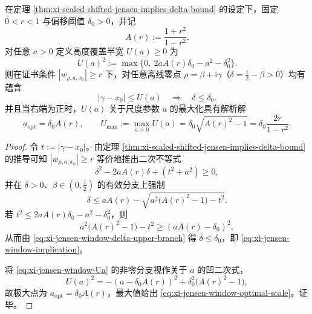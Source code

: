 \begin{theorem}[给定偏移阈值下的高度覆盖窗与尺度最优选择]\label{thm:xi-jensen-window-optimal-scale}
在定理 \ref{thm:xi-scaled-shifted-jensen-implies-delta-bound} 的设定下，固定 \(0<r<1\) 与偏移阈值 \(\delta_0>0\)，并记
\[
A(r):=\frac{1+r^2}{1-r^2}.
\]
对任意 \(a>0\) 定义高度覆盖半宽 \(U(a)\ge 0\) 为
\begin{equation}\label{eq:xi-jensen-window-Ua}
U(a)^2:=\max\bigl\{0,\ 2aA(r)\delta_0-a^2-\delta_0^2\bigr\}.
\end{equation}
则在证书条件 \(|w_{\rho,a,x_0}|\ge r\) 下，对任意离线零点 \(\rho=\beta+\mathrm{i}\gamma\)（\(\delta=\tfrac12-\beta>0\)）均有蕴含
\begin{equation}\label{eq:xi-jensen-window-implication}
|\gamma-x_0|\le U(a)\quad\Longrightarrow\quad \delta\le \delta_0.
\end{equation}
并且当右端为正时，\(U(a)\) 关于尺度参数 \(a\) 的最大化具有解析解
\begin{equation}\label{eq:xi-jensen-window-optimal-scale}
a_{\mathrm{opt}}=\delta_0A(r),
\qquad
U_{\max}:=\max_{a>0}U(a)=\delta_0\sqrt{A(r)^2-1}
=\delta_0\frac{2r}{1-r^2}.
\end{equation}
\end{theorem}
\begin{proof}
令 \(t:=|\gamma-x_0|\)。由定理 \ref{thm:xi-scaled-shifted-jensen-implies-delta-bound} 的推导可知
\(|w_{\rho,a,x_0}|\ge r\) 等价地推出二次不等式
\[
\delta^2-2aA(r)\delta+(t^2+a^2)\ge 0,
\]
并在 \(\delta>0\)、\(\beta\in(0,\tfrac12)\) 的有效分支上强制
\begin{equation}\label{eq:xi-jensen-window-delta-upper-branch}
\delta\le aA(r)-\sqrt{a^2\bigl(A(r)^2-1\bigr)-t^2}.
\end{equation}
若 \(t^2\le 2aA(r)\delta_0-a^2-\delta_0^2\)，则
\[
a^2\bigl(A(r)^2-1\bigr)-t^2\ge (aA(r)-\delta_0)^2,
\]
从而由 \eqref{eq:xi-jensen-window-delta-upper-branch} 得 \(\delta\le \delta_0\)，即
\eqref{eq:xi-jensen-window-implication}。

将 \eqref{eq:xi-jensen-window-Ua} 的非零分支视作关于 \(a\) 的凹二次式，
\[
U(a)^2=-(a-\delta_0A(r))^2+\delta_0^2\bigl(A(r)^2-1\bigr),
\]
故极大点为 \(a_{\mathrm{opt}}=\delta_0A(r)\)，最大值给出 \eqref{eq:xi-jensen-window-optimal-scale}。证毕。
\end{proof}

